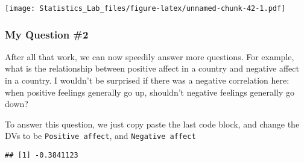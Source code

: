 \documentclass[
]{book}
\newenvironment{Shaded}{\begin{snugshade}}{\end{snugshade}}
\newcommand{\AttributeTok}[1]{\textcolor[rgb]{0.13,0.29,0.53}{#1}}
\newcommand{\CommentTok}[1]{\textcolor[rgb]{0.56,0.35,0.01}{\textit{#1}}}
\newcommand{\FunctionTok}[1]{\textcolor[rgb]{0.13,0.29,0.53}{\textbf{#1}}}
\newcommand{\NormalTok}[1]{#1}
\newcommand{\OtherTok}[1]{\textcolor[rgb]{0.56,0.35,0.01}{#1}}
\newcommand{\SpecialCharTok}[1]{\textcolor[rgb]{0.81,0.36,0.00}{\textbf{#1}}}
\newcommand{\StringTok}[1]{\textcolor[rgb]{0.31,0.60,0.02}{#1}}
\begin{document}
\texttt{[image: Statistics\_Lab\_files/figure-latex/unnamed-chunk-42-1.pdf]}

\hypertarget{my-question-2}{%
\subsubsection{My Question \#2}\label{my-question-2}}

After all that work, we can now speedily answer more questions. For example, what is the relationship between positive affect in a country and negative affect in a country. I wouldn't be surprised if there was a negative correlation here: when positive feelings generally go up, shouldn't negative feelings generally go down?

To answer this question, we just copy paste the last code block, and change the DVs to be \texttt{Positive\ affect}, and \texttt{Negative\ affect}

\begin{Shaded}
\end{Shaded}

\begin{verbatim}
## [1] -0.3841123
\end{verbatim}
\end{document}
